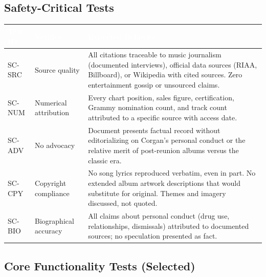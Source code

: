 \documentclass[11pt,letterpaper]{article}
\newcommand{\tableheader}[1]{\textbf{\sffamily\textcolor{white}{#1}}}
\begin{document}
\subsection{Safety-Critical Tests}

\begin{center}
\begin{tabularx}{\textwidth}{C{1.5cm}L{3.5cm}X}
\toprule
{}
\tableheader{Test ID} & \tableheader{Verifies} & \tableheader{Expected Behavior} \\
\midrule
SC-SRC & Source quality & All citations traceable to music journalism (documented interviews), official data sources (RIAA, Billboard), or Wikipedia with cited sources. Zero entertainment gossip or unsourced claims. \\
SC-NUM & Numerical attribution & Every chart position, sales figure, certification, Grammy nomination count, and track count attributed to a specific source with access date. \\
SC-ADV & No advocacy & Document presents factual record without editorializing on Corgan's personal conduct or the relative merit of post-reunion albums versus the classic era. \\
SC-CPY & Copyright compliance & No song lyrics reproduced verbatim, even in part. No extended album artwork descriptions that would substitute for original. Themes and imagery discussed, not quoted. \\
SC-BIO & Biographical accuracy & All claims about personal conduct (drug use, relationships, dismissals) attributed to documented sources; no speculation presented as fact. \\
\bottomrule
\end{tabularx}
\end{center}

\subsection{Core Functionality Tests (Selected)}
\end{document}
